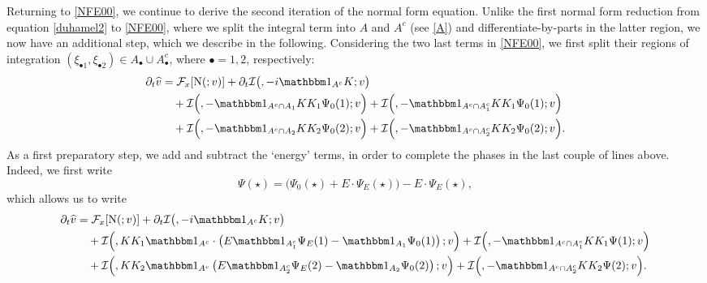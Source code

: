 \documentclass[a4paper,
11pt,  reqno]{amsart}
\makeatletter
\newcommand{\5}{\textup{V}}
\newcommand{\ft}{\widehat}
\newcommand{\ind}{\mathbbm 1}
\newcommand{\dt}{\partial_t}
\theoremstyle{remark}
\newcommand{\bul}{\bullet}
\newcommand{\Ft}{{\mathcal{F}}}
\def\<#1>{\csname MH@symb@#1\endcsname}
\newcommand{\Ical}{\mathcal{I}}
\numberwithin{equation}{section}
\numberwithin{theorem}{section}
\newcommand{\NN}{\mathrm{N}}
\makeatother
\begin{document}
Returning to \eqref{NFE00}, we continue to derive the second iteration of the normal form equation. 
Unlike the first normal form reduction from equation \eqref{duhamel2} to \eqref{NFE00}, where we split the integral term into $A$ and $A^c$ (see \eqref{A}) and differentiate-by-parts in the latter region, we now have an additional step, which we describe in the following. Considering the two last terms in \eqref{NFE00}, we first split their regions of integration $(\xi_{\bul1}, \xi_{\bul2}) \in A_\bul \cup A_\bul^c$, where $\bul = 1,2$, respectively:
\begin{align}
\label{NFE001}
\dt\ft v
&
= 
 \Ft_x[ \NN ( \<1>; v )]  
+ 
\dt \Ical \big( \<1>, -i  \ind_{A^c} K; v \big)
\\
&
\quad 
+
\Ical \Big( \<21>, - \ind_{A^c \cap A_1} KK_1\Psi_0(1) ; v  \Big)  
+
\Ical \Big( \<21>, - \ind_{A^c \cap A_1^c} KK_1\Psi_0(1) ; v  \Big) 
\\
&
\quad 
+
\Ical \Big( \<22>, - \ind_{A^c \cap A_2} KK_2\Psi_0(2) ; v  \Big) 
+
\Ical \Big( \<22>, - \ind_{A^c \cap A_2^c} KK_2\Psi_0(2) ; v  \Big) .
\end{align}
As a first preparatory step, we add and subtract the `energy' terms, in order to complete the phases in the last couple of lines above. Indeed, we first write 
\[
\Psi(\star) = \big( \Psi_0(\star) + E \cdot \Psi_E (\star) \big) - E \cdot \Psi_E(\star),
\]
which allows us to write 
\begin{align}
\label{NFE0011}
\dt\ft v
&
= 
 \Ft_x[ \NN ( \<1>; v )]  
+ 
\dt \Ical \big( \<1>, -i  \ind_{A^c} K; v \big)
\\
&
\quad 
+
\Ical \Big( \<21>, K K_1 \ind_{A^c} \cdot \left( E \ind_{A_1^c}  \Psi_E(1) - \ind_{A_1} \Psi_0(1) \right) ; v  \Big)  
+
\Ical \Big( \<21>, - \ind_{A^c \cap A_1^c} KK_1\Psi(1) ; v  \Big) 
\\
&
\quad 
+
\Ical \Big( \<22>, KK_2 \ind_{A^c} \left( E \ind_{A_2^c} \Psi_E(2) - \ind_{A_2} \Psi_0(2)\right) ; v  \Big) 
+
\Ical \Big( \<22>, - \ind_{A^c \cap A_2^c} KK_2\Psi(2) ; v  \Big). 
\end{align}
\end{document}

